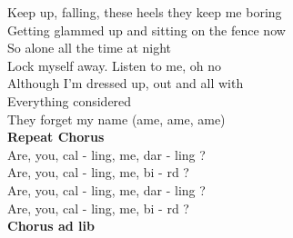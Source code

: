 Keep up, falling, these heels they keep me boring \\
Getting glammed up and sitting on the fence now \\
So alone all the time at night \\
Lock myself away. Listen to me, oh no \\
Although I'm dressed up, out and all with \\
Everything considered\\
They forget my name (ame, ame, ame) \\
\textbf{Repeat Chorus}\\
Are, you, cal - ling, me, dar - ling ? \\
Are, you, cal - ling, me, bi - rd ? \\
Are, you, cal - ling, me, dar - ling ? \\
Are, you, cal - ling, me, bi - rd ? \\
\textbf{Chorus ad lib}


